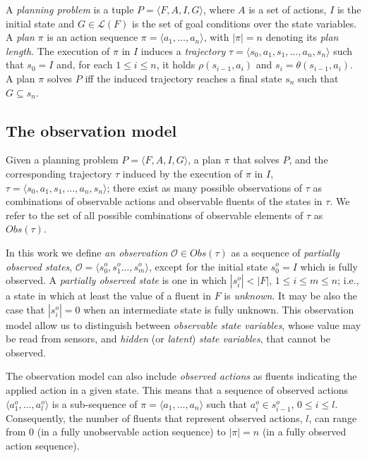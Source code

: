 \documentclass[letterpaper]{article} %
\newcommand{\tup}[1]{{\langle #1 \rangle}}
\begin{document}
A {\em planning problem} is a tuple $P=\tup{F,A,I,G}$, where $A$ is a set of actions, $I$ is the initial state and $G\in\mathcal{L}(F)$ is the set of goal conditions over the state variables. A {\em plan} $\pi$ is an action sequence $\pi=\tup{a_1, \ldots, a_n}$, with $|\pi|=n$ denoting its {\em plan length}. The execution of $\pi$ in $I$ induces a {\em trajectory} $\tau=\tup{s_0, a_1, s_1, \ldots, a_n, s_n}$ such that $s_0=I$ and, for each {\small $1\leq i\leq n$}, it holds $\rho(s_{i-1},a_i)$ and $s_i=\theta(s_{i-1},a_i)$. A plan $\pi$ solves $P$ iff the induced trajectory reaches a final state $s_n$ such that $G \subseteq s_n$.

\subsection{The observation model}
Given a planning problem $P=\tup{F,A,I,G}$, a plan $\pi$ that solves $P$, and the corresponding trajectory $\tau$ induced by the execution of $\pi$ in $I$, $\tau=\tup{s_0, a_1, s_1, \ldots, a_n, s_n}$; there exist as many possible observations of $\tau$ as combinations of observable actions and observable fluents of the states in $\tau$. We refer to the set of all possible combinations of observable elements of $\tau$ as $Obs(\tau)$.

In this work we define {\em an observation} $\mathcal{O}\in Obs(\tau)$ as a sequence of {\em partially observed states}, $\mathcal{O}=\tup{s_0^o,s_1^o \ldots , s_m^o}$, except for the initial state $s_0^o=I$ which is fully observed. A {\em partially observed state} is one in which $|s_i^o| < |F|$, {\small $1\leq i\leq m\leq n$}; i.e., a state in which at least the value of a fluent in $F$ is {\em unknown}. It may be also the case that $|s_i^o| = 0$ when an intermediate state is fully unknown. This observation model allow us to distinguish between {\em observable state variables}, whose value may be read from sensors, and {\em hidden} (or {\em latent}) {\em state variables}, that cannot be observed. 

The observation model can also include {\em observed actions} as fluents indicating the applied action in a given state. This means that a sequence of observed actions $\tup{a_1^o, \ldots, a_l^o}$ is a sub-sequence of $\pi=\tup{a_1, \ldots, a_n}$ such that $a_i^o \in s_{i-1}^o$, {\small $0\leq i \leq l$}. Consequently, the number of fluents that represent observed actions, $l$, can range from $0$ (in a fully unobservable action sequence) to $|\pi|=n$ (in a fully observed action sequence).
\end{document}
